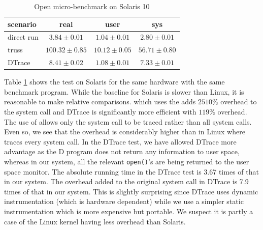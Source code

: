 \begin{table}
\small
\centering
\begin{tabular}{|l||c|c|c|}
\hline
scenario & real & user & sys \\
\hline \hline
direct run & \begin{math} 3.84\pm0.01 \end{math} & \begin{math} 1.04\pm0.01 \end{math} & \begin{math} 2.80\pm0.01 \end{math} \\
\hline
truss & \begin{math} 100.32\pm0.85 \end{math} & \begin{math} 10.12\pm0.05 \end{math} & \begin{math} 56.71\pm0.80 \end{math} \\
\hline
DTrace\footnotemark & \begin{math} 8.41\pm0.02 \end{math} & \begin{math} 1.08\pm0.01 \end{math} & \begin{math} 7.33\pm0.01 \end{math} \\
\hline
\end{tabular}
\caption{Open micro-benchmark on Solaris 10}
\label{tab:lbox-sol}
\end{table}


Table \ref{tab:lbox-sol} shows the
test on Solaris for the same hardware with the same benchmark program. 
While the baseline for Solaris is slower than Linux, it is reasonable
to make relative comparisons.
 which uses the  adds $2510\%$ overhead 
to the  system call and DTrace is significantly more efficient
with $119\%$ overhead.
The use of  allows only the  system call to
be traced rather than all system calls. Even so, we see that the overhead
is considerably higher than in Linux where  traces every
system call.
In the DTrace test, we have allowed DTrace more advantage 
as the D program does not return any information to user space, 
whereas in our system, all
the relevant {\tt open()}'s are being
returned to the user space monitor.
The absolute running time in the DTrace test is 3.67 times 
of that in our system.
The overhead added to the original system call in DTrace is 7.9 times of
that in our system.
This is slightly surprising since DTrace uses dynamic instrumentation
(which is hardware dependent) while we use a simpler static instrumentation
which is more expensive but portable.
We suspect it is partly a case of the Linux kernel having less overhead
than Solaris.

